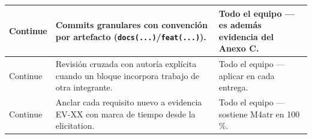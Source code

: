 \begin{center}
\begin{longtable}{|p{1.9cm}|p{7.2cm}|p{4.9cm}|}
Continue & Commits granulares con convenci\'on por artefacto (\texttt{docs(...)}/\texttt{feat(...)}). & Todo el equipo --- es adem\'as evidencia del Anexo C. \\ \hline

Continue & Revisi\'on cruzada con autor\'ia explícita cuando un bloque incorpora trabajo de otra integrante. & Todo el equipo --- aplicar en cada entrega. \\ \hline

Continue & Anclar cada requisito nuevo a evidencia EV-XX con marca de tiempo desde la elicitation. & Todo el equipo --- sostiene M4atr en 100\,\%. \\ \hline
\end{longtable}
\end{center}
